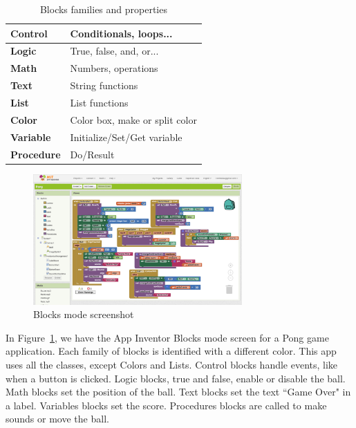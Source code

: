 \documentclass[a4paper]{article}
\begin{document}
\begin{table}
\begin{center}
\caption{Blocks families and properties}
\bigskip
\label{tab:block-fam}
\begin{tabular}{|l|l|}
\hline
\textbf{Control} & Conditionals, loops... \\ \hline
\textbf{Logic} & True, false, and, or... \\ \hline
\textbf{Math} & Numbers, operations\\ \hline
\textbf{Text} & String functions\\ \hline
\textbf{List} & List functions\\ \hline
\textbf{Color} & Color box, make or split color \\ \hline
\textbf{Variable} & Initialize/Set/Get variable\\ \hline
\textbf{Procedure} & Do/Result\\ \hline
\end{tabular}
\end{center}
\end{table}

\begin{figure}
\begin{center}
\includegraphics[height=5cm]{blocks-example}
\caption{Blocks mode screenshot}
\label{fig:blocks-example}
\end{center}
\end{figure}

In Figure~\ref{fig:blocks-example}, we have the App Inventor Blocks mode screen for a Pong game application. Each family of blocks is identified with a different color. This app uses all the classes, except Colors and Lists. Control blocks handle events, like when a button is clicked. Logic blocks, true and false, enable or disable the ball. Math blocks set the position of the ball. Text blocks set the text ``Game Over" in a label. Variables blocks set the score. Procedures blocks are called to make sounds or move the ball.
\end{document}
